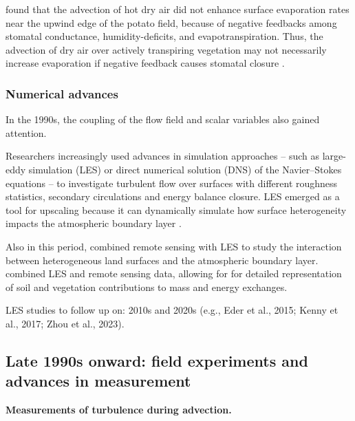 \documentclass{article}
\begin{document}
     
    
    
    \citet{baldocchi_intra-field_1995} found that the advection of hot dry air did not enhance surface evaporation rates near the upwind edge of the potato field, because of negative feedbacks among stomatal conductance, humidity-deficits, and evapotranspiration.
    Thus, the advection of dry air over actively transpiring vegetation may not necessarily increase evaporation if negative feedback causes stomatal closure \cite{philip1987advection, baldocchi1995intra}. 
       
    \subsubsection*{Numerical advances}
    
     In the 1990s, the coupling of the flow field and scalar variables also gained attention.
     
    Researchers  increasingly used advances in simulation approaches -- such as large-eddy simulation (LES) or direct numerical solution (DNS) of the Navier–Stokes equations -- to investigate turbulent flow over surfaces with different roughness statistics, secondary circulations and energy balance closure.
    LES  emerged as a  tool for upscaling because it can dynamically simulate how surface heterogeneity impacts the atmospheric boundary layer \cite{albertson2001large}.
    
    Also in this period, \cite{albertson2001large} combined  remote sensing  with LES to study the interaction between heterogeneous land surfaces and the atmospheric boundary layer. 
    \citet{kustas2003effects} combined LES and remote sensing data, allowing for for detailed representation of soil and vegetation contributions to mass and energy exchanges.
    
     LES studies to follow up on: 2010s and 2020s (e.g., Eder et al., 2015; Kenny et al., 2017; Zhou et al., 2023).
    
    \subsection{Late 1990s onward: field experiments and advances in  measurement}
    
    \textbf{Measurements of turbulence during advection. }
    
\end{document}
